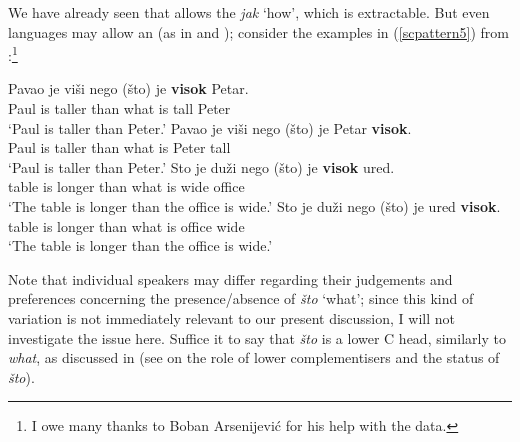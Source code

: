 We have already seen that  allows the  \textit{jak} `how', which is extractable. But even  languages may allow an  (as in  and ); consider the examples in (\ref{scpattern5}) from :\footnote{I owe many thanks to Boban Arsenijević for his help with the  data.}

\ea \label{scpattern5}
\ea \gll Pavao je viši nego (što) je \textbf{visok} Petar. \label{scgiveninternal}\\
Paul is taller than \phantom{(}what is tall Peter\\
\glt `Paul is taller than Peter.'
\ex \gll Pavao je viši nego (što) je Petar \textbf{visok}. \label{scgivenfinal}\\
Paul is taller than \phantom{(}what is Peter tall\\
\glt `Paul is taller than Peter.'
\ex \gll Sto je duži nego (što) je \textbf{visok} ured. \label{sccontrastinternal}\\
table is longer than \phantom{(}what is wide office\\
\glt `The table is longer than the office is wide.'
\ex \gll Sto je duži nego (što) je ured \textbf{visok}. \label{sccontrastfinal}\\
table is longer than \phantom{(}what is office wide\\
\glt `The table is longer than the office is wide.'
\z
\z

Note that individual speakers may differ regarding their judgements and preferences concerning the presence/absence of \textit{što} `what'; since this kind of variation is not immediately relevant to our present discussion, I will not investigate the issue here. Suffice it to say that \textit{što} is a lower C head, similarly to  \textit{what}, as discussed in  (see \citealt{bacskaiatkari2016alh} on the role of lower complementisers and the status of \textit{što}).

